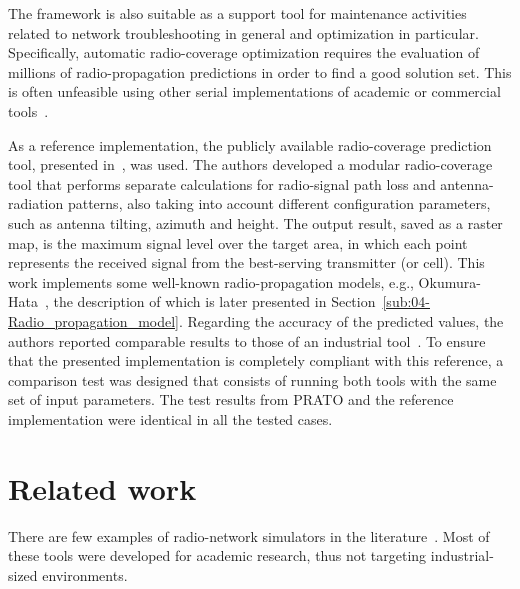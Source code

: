 The framework is also suitable as a support tool for maintenance activities
related to network troubleshooting in general and optimization in
particular. Specifically, automatic radio-coverage optimization requires
the evaluation of millions of radio-propagation predictions in order
to find a good solution set. This is often unfeasible using other
serial implementations of academic or commercial tools~\cite{Ozimek_Open.source.radio.coverage.prediction:2010,Mehlfuhrer_The_Vienna_LTE_Simulators_enabling_reproducibility_in_wireless_communications_research:2011,Piro_Simulating_LTE_cellular_systems_an_open_source_framework:2011}.

As a reference implementation, the publicly available radio-coverage
prediction tool, presented in~\cite{Ozimek_Open.source.radio.coverage.prediction:2010},
was used. The authors developed a modular radio-coverage tool that
performs separate calculations for radio-signal path loss and antenna-radiation
patterns, also taking into account different configuration parameters,
such as antenna tilting, azimuth and height. The output result, saved
as a raster map, is the maximum signal level over the target area,
in which each point represents the received signal from the best-serving
transmitter (or cell). This work implements some well-known radio-propagation
models, e.g., Okumura-Hata~\cite{Hata_Empirical_formula_for_propagation_loss_in_land_mobile_radio_services:1980},
the description of which is later presented in Section~\ref{sub:04-Radio_propagation_model}.
Regarding the accuracy of the predicted values, the authors reported
comparable results to those of an industrial tool~\cite{Ozimek_Open.source.radio.coverage.prediction:2010}.
To ensure that the presented implementation is completely compliant
with this reference, a comparison test was designed that consists
of running both tools with the same set of input parameters. The test
results from PRATO and the reference implementation were identical
in all the tested cases.






\section{Related work \label{sec:04-Related_work}}

There are few examples of radio-network simulators in the literature~\cite{Ozimek_Open.source.radio.coverage.prediction:2010,Mehlfuhrer_The_Vienna_LTE_Simulators_enabling_reproducibility_in_wireless_communications_research:2011,Pillekeit-A_hybrid_simulation_framework_for_the_evaluation_of_common_RRM:2012,Piro_Simulating_LTE_cellular_systems_an_open_source_framework:2011,Sanchez_Performance_evaluation_of_OFDMA_wireless_systems_using_WM_SIM:2006,Yeung-Detailed_OFDM_modeling_in_network_simulation:2004}.
Most of these tools were developed for academic research, thus not
targeting industrial-sized environments. 

